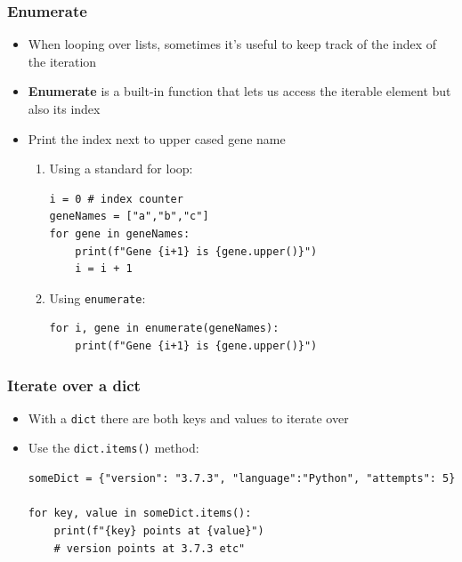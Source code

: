 \documentclass[xcolor=table]{beamer}
\begin{document}
\begin{frame}[fragile]
\frametitle{Enumerate}

\begin{itemize}\addtolength{\itemsep}{0.5\baselineskip}
\item<1-> When looping over lists, sometimes it's useful to keep track of the
index of the iteration

\item<2-> \textbf{Enumerate} is a built-in function that lets us access the
iterable element but also its index

\item<3-> Print the index next to upper cased gene name

\begin{enumerate}\addtolength{\itemsep}{-1\baselineskip}

\item<3-> Using a standard for loop:
\begin{lstlisting}[style=python]
i = 0 # index counter
geneNames = ["a","b","c"]
for gene in geneNames:
    print(f"Gene {i+1} is {gene.upper()}")
    i = i + 1
\end{lstlisting}

\item<4-> Using \texttt{enumerate}:
\begin{lstlisting}[style=python]
for i, gene in enumerate(geneNames):
    print(f"Gene {i+1} is {gene.upper()}")
\end{lstlisting}

\end{enumerate}
\end{itemize}

\end{frame}


\begin{frame}[fragile]
\frametitle{Iterate over a dict}
\begin{itemize}\addtolength{\itemsep}{0.5\baselineskip}
        \item With a \texttt{dict} there are both keys and values to iterate over
        \item Use the \texttt{dict.items()} method:
\begin{lstlisting}[style=python]
someDict = {"version": "3.7.3", "language":"Python", "attempts": 5}

for key, value in someDict.items():
    print(f"{key} points at {value}")
    # version points at 3.7.3 etc"
\end{lstlisting}
    \end{itemize}
\end{frame}


\end{document}
